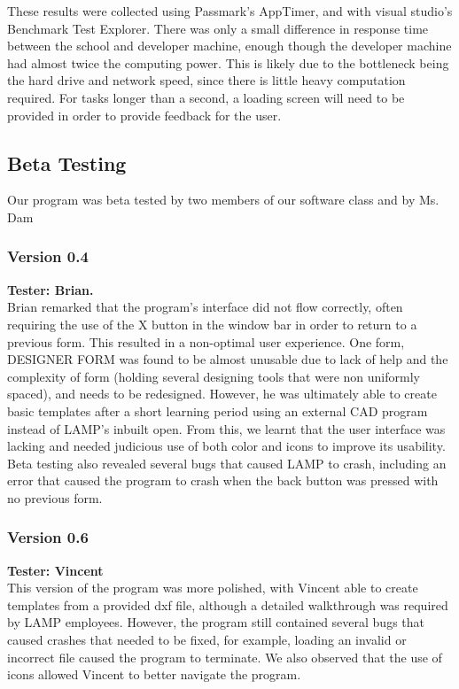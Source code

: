 \documentclass[oneside,openany,11pt,a4paper]{report}
\begin{document}
These results were collected using Passmark's AppTimer, and with visual studio's Benchmark Test Explorer. 
There was only a small difference in response time between the school and developer machine, enough though the developer machine had almost twice the computing power. This is likely due to the bottleneck being the hard drive and network speed, since there is little heavy computation required. For tasks longer than a second, a loading screen will need to be provided in order to provide feedback for the user. 

\subsection{Beta Testing}
Our program was beta tested by two members of our software class and by Ms. Dam
\subsubsection{Version 0.4}
\textbf{Tester: Brian.} \\
Brian remarked that the program’s interface did not flow correctly, often requiring the use of the X button in the window bar in order to return to a previous form. This resulted in a non-optimal user experience. One form, DESIGNER FORM was found to be almost unusable due to lack of help and the complexity of form (holding several designing tools that were non uniformly spaced), and needs to be redesigned. However, he was ultimately able to create basic templates after a short learning period using an external CAD program instead of LAMP’s inbuilt open. From this, we learnt that the user interface was lacking and needed judicious use of both color and icons to improve its usability. Beta testing also revealed several bugs that caused LAMP to crash, including an error that caused the program to crash when the back button was pressed with no previous form.


\subsubsection{Version 0.6}
\textbf{Tester: Vincent} \\
This version of the program was more polished, with Vincent able to create templates from a provided dxf file, although a detailed walkthrough was required by LAMP employees. However, the program still contained several bugs that caused crashes that needed to be fixed, for example, loading an invalid or incorrect file caused the program to terminate. We also observed that the use of icons allowed Vincent to better navigate the program.
\end{document}
